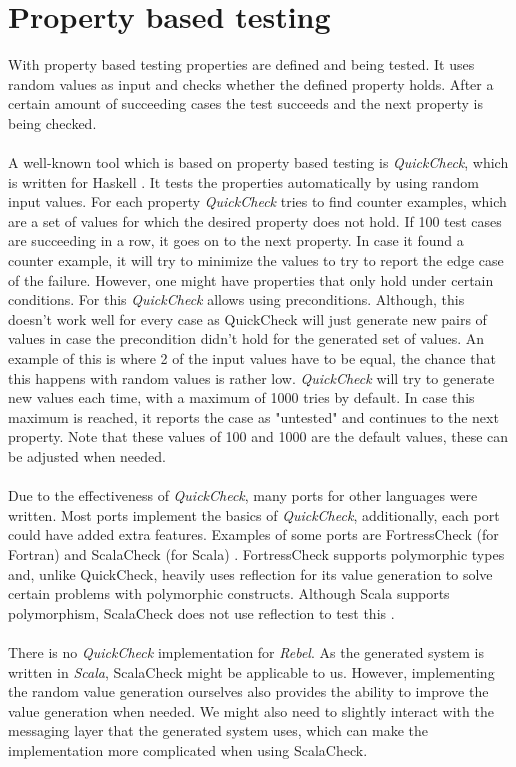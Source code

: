 \section{Property based testing}
With property based testing properties are defined and being tested. It uses random values as input and checks whether the defined property holds. After a certain amount of succeeding cases the test succeeds and the next property is being checked.\\
\\
A well-known tool which is based on property based testing is \textit{QuickCheck}, which is written for Haskell \cite{claessen2011quickcheck}. It tests the properties automatically by using random input values. For each property \textit{QuickCheck} tries to find counter examples, which are a set of values for which the desired property does not hold. If 100 test cases are succeeding in a row, it goes on to the next property. In case it found a counter example, it will try to minimize the values to try to report the edge case of the failure. However, one might have properties that only hold under certain conditions. For this \textit{QuickCheck} allows using preconditions. Although, this doesn't work well for every case as QuickCheck will just generate new pairs of values in case the precondition didn't hold for the generated set of values. An example of this is where 2 of the input values have to be equal, the chance that this happens with random values is rather low. \textit{QuickCheck} will try to generate new values each time, with a maximum of 1000 tries by default. In case this maximum is reached, it reports the case as "untested" and continues to the next property. Note that these values of 100 and 1000 are the default values, these can be adjusted when needed.\\
\\
Due to the effectiveness of \textit{QuickCheck}, many ports for other languages were written. Most ports implement the basics of \textit{QuickCheck}, additionally, each port could have added extra features. Examples of some ports are FortressCheck (for Fortran) \cite{kang2011fortresscheck} and ScalaCheck (for Scala) \cite{siteScalaCheck2015}. FortressCheck supports polymorphic types and, unlike QuickCheck, heavily uses reflection for its value generation to solve certain problems with polymorphic constructs. Although Scala supports polymorphism, ScalaCheck does not use reflection to test this \cite{kang2011fortresscheck}.\\
\\
There is no \textit{QuickCheck} implementation for \textit{Rebel}. As the generated system is written in \textit{Scala}, ScalaCheck might be applicable to us. However, implementing the random value generation ourselves also provides the ability to improve the value generation when needed. We might also need to slightly interact with the messaging layer that the generated system uses, which can make the implementation more complicated when using ScalaCheck.

